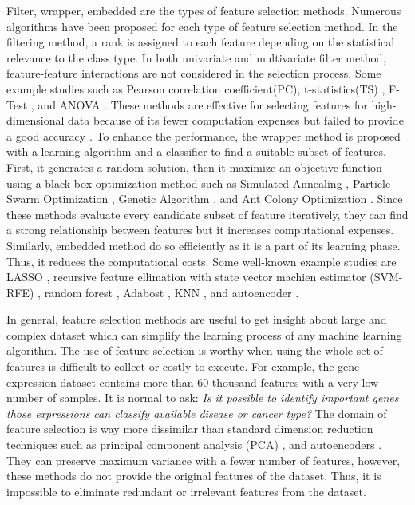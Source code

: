 \documentclass{bioinfo}
\begin{document}
Filter, wrapper, embedded are the types of feature selection methods. Numerous algorithms have been proposed for each type of feature selection method. 
In the filtering method, a rank is assigned to each feature depending on the statistical relevance to the class type. In both univariate and multivariate filter method, feature-feature interactions are not considered in the selection process. Some example studies such as Pearson correlation coefficient(PC), t-statistics(TS) \cite{speed2003statistical}, F-Test \cite{ding2005minimum}, and ANOVA \cite{ding2015identification}. These methods are effective for selecting features for high-dimensional data because of its fewer computation expenses but failed to provide a good accuracy \cite{sun2018cross}. 
To enhance the performance, the wrapper method is proposed with a learning algorithm and a classifier to find a suitable subset of features. First, it generates a random solution, then it maximize an objective function using a black-box optimization method \cite{rau2019exploring} such as Simulated Annealing \cite{jeong2018feature}, Particle Swarm Optimization \cite{xue2012particle}, Genetic Algorithm \cite{wu2011feature}, and Ant Colony Optimization \cite{kabir2012new}. Since these methods evaluate every candidate subset of feature iteratively, they can find a strong relationship between features but it increases computational expenses. 
Similarly, embedded method do so efficiently as it is a part of its learning phase. Thus, it reduces the computational costs. Some well-known example studies are  LASSO \cite{tibshirani1996regression}, recursive feature ellimation with state vector machien estimator (SVM-RFE) \cite{abdullah2019, guyon2002gene, fang2019tightly}, random forest \cite{pouyan2018random, ram2017classification}, Adabost \cite{wang2012adaboost}, KNN \cite{le2019statistical}, and autoencoder \cite{lu2019autoencoder}.

In general, feature selection methods are useful to get insight about large and complex dataset which can simplify the learning process of any machine learning algorithm. The use of feature selection is worthy when using the whole set of features is difficult to collect or costly to execute. For example, the gene expression dataset contains more than 60 thousand features with a very low number of samples. It is normal to ask: \textit{Is it possible to identify important genes those expressions can classify available disease or cancer type?} The domain of feature selection is way more dissimilar than standard dimension reduction techniques such as principal component analysis (PCA) \cite{hotelling1933analysis}, and autoencoders \cite{hinton2006reducing}. They can preserve maximum variance with a fewer number of features, however, these methods do not provide the original features of the dataset. Thus, it is impossible to eliminate redundant or irrelevant features from the dataset. 
\end{document}
